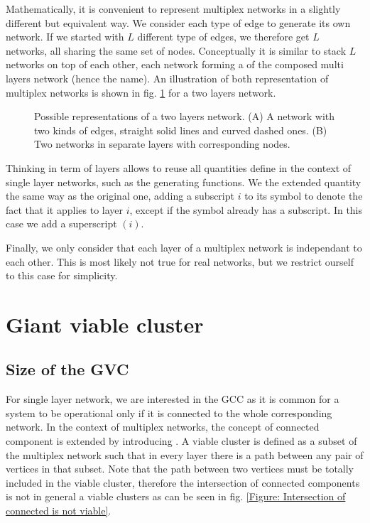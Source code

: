 \documentclass[
11pt, %
english, %
singlespacing, %
nolistspacing, %
liststotoc, %
headsepline, %
]{MastersDoctoralThesis} %
\begin{document}
Mathematically, it is convenient to represent multiplex networks in a slightly different but equivalent way. We consider each type of edge to generate its own network. If we started with $L$ different type of edges, we therefore get $L$ networks, all sharing the same set of nodes. Conceptually it is similar to stack $L$ networks on top of each other, each network forming a  of the composed multi layers network (hence the name). An illustration of both representation of multiplex networks is shown in fig. \ref{Figure: Representations of multiplex networks} for a two layers network.

\begin{figure}
	
	\caption{Possible representations of a two layers network. (A) A network with two kinds of edges, straight solid lines and curved dashed ones. (B) Two networks in separate layers with corresponding nodes.}
	\label{Figure: Representations of multiplex networks}
\end{figure}

Thinking in term of layers allows to reuse all quantities define in the context of single layer networks, such as the generating functions. We the extended quantity the same way as the original one, adding a subscript $i$ to its symbol to denote the fact that it applies to layer $i$, except if the symbol already has a subscript. In this case we add a superscript $(i)$.

Finally, we only consider that each layer of a multiplex network is independant to each other. This is most likely not true for real networks, but we restrict ourself to this case for simplicity.

\section{Giant viable cluster}

\subsection{Size of the GVC}
\label{Section: Giant Viable Cluster}


For single layer network, we are interested in the GCC as it is common for a system to be operational only if it is connected to the whole corresponding network. In the context of multiplex networks, the concept of connected component is extended by introducing . A viable cluster is defined as a subset of the multiplex network such that in every layer there is a path between any pair of vertices in that subset. Note that the path between two vertices must be totally included in the viable cluster, therefore the intersection of connected components is not in general a viable clusters as can be seen in fig. \ref{Figure: Intersection of connected is not viable}.
\end{document}
